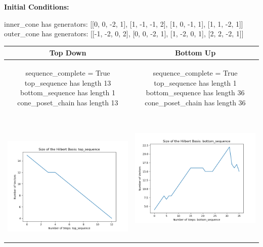 \documentclass[10pt]{article}
\begin{document}
\textbf{Initial Conditions:}
\begin{SAGE}
inner_cone has generators: 
[[0, 0, -2, 1], [1, -1, -1, 2], [1, 0, -1, 1], [1, 1, -2, 1]]
outer_cone has generators: 
[[-1, -2, 0, 2], [0, 0, -2, 1], [1, -2, 0, 1], [2, 2, -2, 1]]

\end{SAGE}
\begin{tabular}{c|c}
\textbf{Top Down} & \textbf{Bottom Up} \\ \hline  
\begin{SAGE}
	sequence_complete = True
	top_sequence has length 13
	bottom_sequence has length 1
	cone_poset_chain has length 13
\end{SAGE} 
&
\begin{SAGE}
	sequence_complete = True
	top_sequence has length 1
	bottom_sequence has length 36
	cone_poset_chain has length 36
\end{SAGE} 
\\ \hline
\
\begin{minipage}{.45\textwidth}
\includegraphics[width=\textwidth]{"DATA/4d/4 generators 2 bound A/top_sequence SIZE"}
\end{minipage} &
\begin{minipage}{.45\textwidth}
\includegraphics[width=\textwidth]{"DATA/4d/4 generators 2 bound A bottomup/bottom_sequence SIZE"}

\end{minipage}
\end{tabular}
\end{document}
